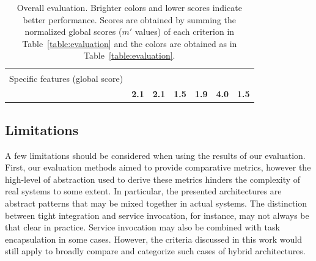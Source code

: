 \documentclass[preprint,3p,twocolumn]{elsarticle}
\begin{document}
\begin{table}
\begin{tabular}{rcccccc}
                                     & \cellcolor[HTML]{99FF99}{0.00}
                                     & \cellcolor[HTML]{99CC99}{0.50}
                                     & \cellcolor[HTML]{99CC99}{0.50}\\
Specific features (global score) & \cellcolor[HTML]{99CC99}{0.50}
                                     & \cellcolor[HTML]{99CC99}{0.50}
                                     & \cellcolor[HTML]{999999}{1.00}
                                     & \cellcolor[HTML]{99CC99}{0.50}
                                     & \cellcolor[HTML]{99CC99}{0.50}
                                     & \cellcolor[HTML]{99FF99}{0.00}\\
                                    & \cellcolor[HTML]{99E799}\textbf{2.1}
                                    & \cellcolor[HTML]{99E699}\textbf{2.1}
                                    & \cellcolor[HTML]{99FE99}\textbf{1.5}
                                    & \cellcolor[HTML]{99EF99}\textbf{1.9}
                                    & \cellcolor[HTML]{999999}\textbf{4.0}
                                    & \cellcolor[HTML]{99FF99}\textbf{1.5}\\
\end{tabular}
\caption{Overall evaluation. Brighter colors and lower scores indicate better performance. Scores
  are obtained by summing the normalized global scores ($m'$ values) of
  each criterion in Table~\ref{table:evaluation} and the colors are obtained as in Table~\ref{table:evaluation}. }
\label{table:overall}
\end{table}

\subsection{Limitations}


A few limitations should be considered when using the results of our
evaluation. First, our evaluation methods aimed to provide comparative
metrics, however the high-level of abstraction used to derive these
metrics hinders the complexity of real systems to some
extent. In particular, the
presented architectures are abstract patterns that may be mixed
together in actual systems. The distinction between tight integration and
service invocation, for instance, may not always be that clear in
practice. Service invocation may also be combined with task
encapsulation in some cases. However, the criteria discussed in this
work would still apply to broadly compare and categorize such cases of
hybrid architectures.
\end{document}
